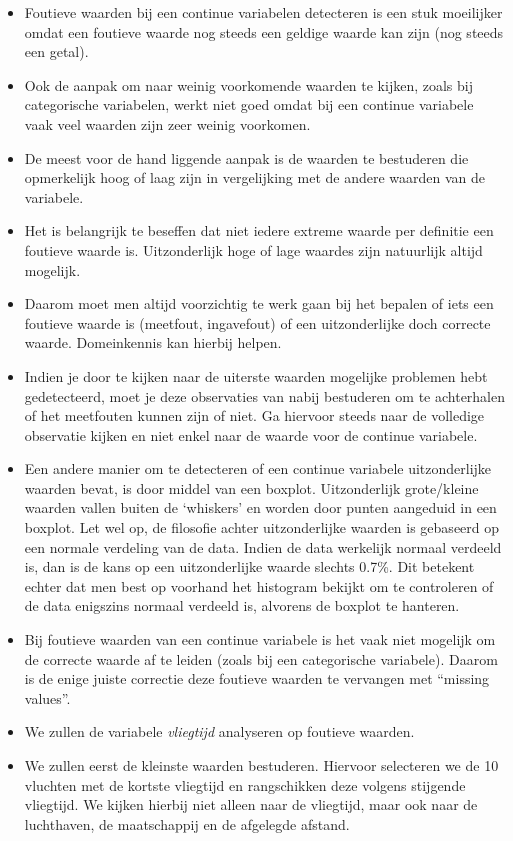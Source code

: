 \documentclass[]{tufte-book}
\providecommand{\tightlist}{%
  \setlength{\itemsep}{0pt}\setlength{\parskip}{0pt}}
\begin{document}
\begin{itemize}
\tightlist
\item
  Foutieve waarden bij een continue variabelen detecteren is een stuk moeilijker omdat een foutieve waarde nog steeds een geldige waarde kan zijn (nog steeds een getal).
\item
  Ook de aanpak om naar weinig voorkomende waarden te kijken, zoals bij categorische variabelen, werkt niet goed omdat bij een continue variabele vaak veel waarden zijn zeer weinig voorkomen.
\item
  De meest voor de hand liggende aanpak is de waarden te bestuderen die opmerkelijk hoog of laag zijn in vergelijking met de andere waarden van de variabele.
\item
  Het is belangrijk te beseffen dat niet iedere extreme waarde per definitie een foutieve waarde is. Uitzonderlijk hoge of lage waardes zijn natuurlijk altijd mogelijk.
\item
  Daarom moet men altijd voorzichtig te werk gaan bij het bepalen of iets een foutieve waarde is (meetfout, ingavefout) of een uitzonderlijke doch correcte waarde. Domeinkennis kan hierbij helpen.
\item
  Indien je door te kijken naar de uiterste waarden mogelijke problemen hebt gedetecteerd, moet je deze observaties van nabij bestuderen om te achterhalen of het meetfouten kunnen zijn of niet. Ga hiervoor steeds naar de volledige observatie kijken en niet enkel naar de waarde voor de continue variabele.
\item
  Een andere manier om te detecteren of een continue variabele uitzonderlijke waarden bevat, is door middel van een boxplot. Uitzonderlijk grote/kleine waarden vallen buiten de `whiskers' en worden door punten aangeduid in een boxplot. Let wel op, de filosofie achter uitzonderlijke waarden is gebaseerd op een normale verdeling van de data. Indien de data werkelijk normaal verdeeld is, dan is de kans op een uitzonderlijke waarde slechts 0.7\%. Dit betekent echter dat men best op voorhand het histogram bekijkt om te controleren of de data enigszins normaal verdeeld is, alvorens de boxplot te hanteren.
\item
  Bij foutieve waarden van een continue variabele is het vaak niet mogelijk om de correcte waarde af te leiden (zoals bij een categorische variabele). Daarom is de enige juiste correctie deze foutieve waarden te vervangen met ``missing values''.
\item
  We zullen de variabele \emph{vliegtijd} analyseren op foutieve waarden.
\item
  We zullen eerst de kleinste waarden bestuderen. Hiervoor selecteren we de 10 vluchten met de kortste vliegtijd en rangschikken deze volgens stijgende vliegtijd. We kijken hierbij niet alleen naar de vliegtijd, maar ook naar de luchthaven, de maatschappij en de afgelegde afstand.
\end{itemize}
\end{document}
